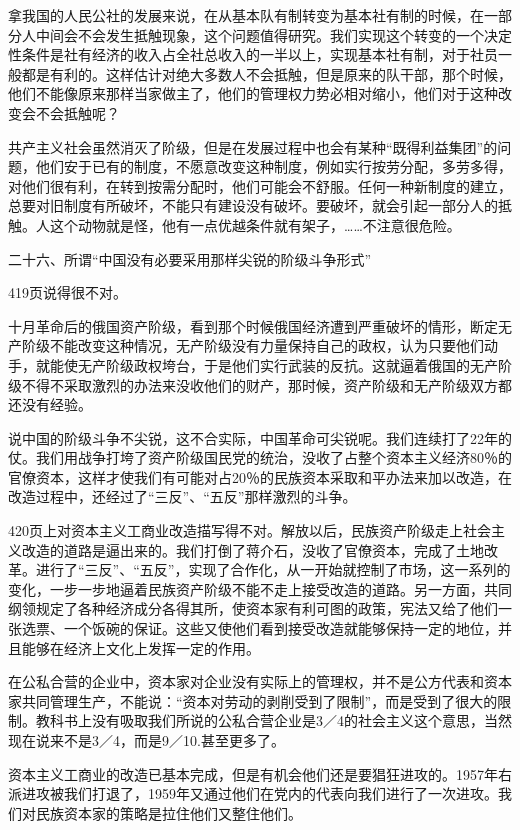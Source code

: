 拿我国的人民公社的发展来说，在从基本队有制转变为基本社有制的时候，在一部分人中间会不会发生抵触现象，这个问题值得研究。我们实现这个转变的一个决定性条件是社有经济的收入占全社总收入的一半以上，实现基本社有制，对于社员一般都是有利的。这样估计对绝大多数人不会抵触，但是原来的队干部，那个时候，他们不能像原来那样当家做主了，他们的管理权力势必相对缩小，他们对于这种改变会不会抵触呢？

共产主义社会虽然消灭了阶级，但是在发展过程中也会有某种“既得利益集团”的问题，他们安于已有的制度，不愿意改变这种制度，例如实行按劳分配，多劳多得，对他们很有利，在转到按需分配时，他们可能会不舒服。任何一种新制度的建立，总要对旧制度有所破坏，不能只有建设没有破坏。要破坏，就会引起一部分人的抵触。人这个动物就是怪，他有一点优越条件就有架子，……不注意很危险。

二十六、所谓“中国没有必要采用那样尖锐的阶级斗争形式”

419页说得很不对。

十月革命后的俄国资产阶级，看到那个时候俄国经济遭到严重破坏的情形，断定无产阶级不能改变这种情况，无产阶级没有力量保持自己的政权，认为只要他们动手，就能使无产阶级政权垮台，于是他们实行武装的反抗。这就逼着俄国的无产阶级不得不采取激烈的办法来没收他们的财产，那时候，资产阶级和无产阶级双方都还没有经验。

说中国的阶级斗争不尖锐，这不合实际，中国革命可尖锐呢。我们连续打了22年的仗。我们用战争打垮了资产阶级国民党的统治，没收了占整个资本主义经济80％的官僚资本，这样才使我们有可能对占20％的民族资本采取和平办法来加以改造，在改造过程中，还经过了“三反”、“五反”那样激烈的斗争。

420页上对资本主义工商业改造描写得不对。解放以后，民族资产阶级走上社会主义改造的道路是逼出来的。我们打倒了蒋介石，没收了官僚资本，完成了土地改革。进行了“三反”、“五反”，实现了合作化，从一开始就控制了市场，这一系列的变化，一步一步地逼着民族资产阶级不能不走上接受改造的道路。另一方面，共同纲领规定了各种经济成分各得其所，使资本家有利可图的政策，宪法又给了他们一张选票、一个饭碗的保证。这些又使他们看到接受改造就能够保持一定的地位，并且能够在经济上文化上发挥一定的作用。

在公私合营的企业中，资本家对企业没有实际上的管理权，并不是公方代表和资本家共同管理生产，不能说：“资本对劳动的剥削受到了限制”，而是受到了很大的限制。教科书上没有吸取我们所说的公私合营企业是3／4的社会主义这个意思，当然现在说来不是3／4，而是9／10.甚至更多了。

资本主义工商业的改造已基本完成，但是有机会他们还是要猖狂进攻的。1957年右派进攻被我们打退了，1959年又通过他们在党内的代表向我们进行了一次进攻。我们对民族资本家的策略是拉住他们又整住他们。

